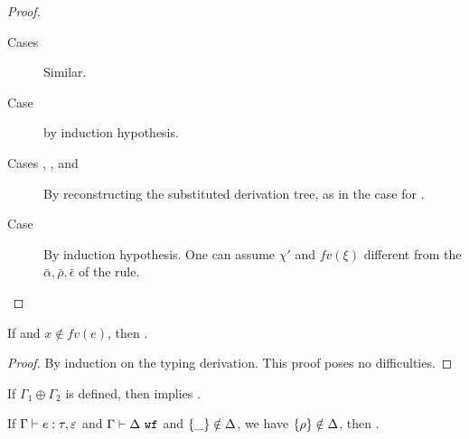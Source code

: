 \documentclass[a4paper]{article}
\begin{document}
\begin{proof}
\begin{description}
      
    \item[Cases \absregrule] Similar. 


    \item[Case \subeffrule] by induction hypothesis. 

    \item[Cases \appregrule, , \regionrule{} and \locrule] By
      reconstructing the subs\-ti\-tu\-ted de\-ri\-vation tree, as in the case
      for \absrule{}.  
  
    \item[Case ] By induction hypothesis. One can assume $\chi'$ and
      $fv(\xi)$ different from the $\bar{\alpha},\bar{\rho},\bar{\epsilon}$ of the rule.

  \end{description} 
\end{proof}

\begin{prop}
  \label{prop:irrelhyp}
  If  and $x\notin fv(e)$, then
  .
\end{prop}
\begin{proof}
  By induction on the typing derivation. This proof poses no difficulties.
\end{proof}

\begin{prop}
  \label{prop:weakweak}
  If $\Gamma_1 \oplus \Gamma_2$ is defined, then  implies
  .
\end{prop}

\begin{prop}
  \label{prop:strongweak}
  If $\Gamma \vdash e : \tau, \varepsilon $ and ${\normalfont \Gamma \vdash \Delta\ \texttt{wf}}$ and $\left\{ \_ \right\}\notin \Delta$, we
  have $\left\{ \rho \right\}\notin \Delta$, then .
\end{prop}
\end{document}
